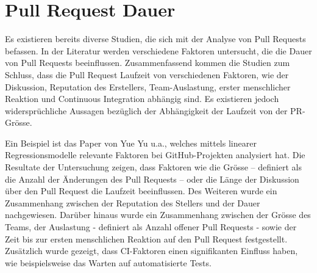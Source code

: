 \section{Pull Request Dauer}
\label{sec:PullRequestDauer}
Es existieren bereits diverse Studien, die sich mit der Analyse von Pull Requests befassen. In der Literatur werden verschiedene Faktoren untersucht, die die Dauer von Pull Requests beeinflussen. Zusammenfassend kommen die Studien zum Schluss, dass die Pull Request Laufzeit von verschiedenen Faktoren, wie der Diskussion, Reputation des Erstellers, Team-Auslastung, erster menschlicher Reaktion und Continuous Integration abhängig sind. Es existieren jedoch widersprüchliche Aussagen bezüglich der Abhängigkeit der Laufzeit von der PR-Grösse. \parencite{yu_wait_2015}\parencite{hasan_understanding_2023}\parencite{kudrjavets_small_2022}\parencite{bernardo_studying_2018}

Ein Beispiel ist das Paper von Yue Yu u.a.\parencite{yu_wait_2015}, welches  mittels linearer Regressionsmodelle relevante Faktoren bei GitHub-Projekten analysiert hat. Die Resultate der Untersuchung zeigen, dass Faktoren wie die Grösse – definiert als die Anzahl der Änderungen des Pull Requests – oder die Länge der Diskussion über den Pull Request die Laufzeit beeinflussen. Des Weiteren wurde ein Zusammenhang zwischen der Reputation des Stellers und der Dauer nachgewiesen. Darüber hinaus wurde ein Zusammenhang zwischen der Grösse des Teams, der Auslastung - definiert als Anzahl offener Pull Requests - sowie der Zeit bis zur ersten menschlichen Reaktion auf den Pull Request festgestellt. Zusätzlich wurde gezeigt, dass CI-Faktoren einen signifikanten Einfluss haben, wie beispielsweise das Warten auf automatisierte Tests.~\parencite{yu_wait_2015}

